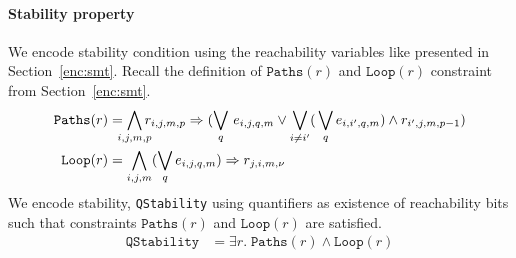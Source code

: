 \paragraph{Stability property}
%
%
We encode stability condition using the reachability variables like presented in Section~\ref{enc:smt}. 
%
Recall the definition of $\texttt{Paths}(r)$ and $\texttt{Loop}(r)$ constraint from Section~\ref{enc:smt}.
%  
\begin{align*}
\texttt{Paths}(r) &= \bigwedge\limits_{\mathclap{i,j,m,p}} r_{i,j,m,p} \limplies (\bigvee_{q} \, e_{i,j,q,m} \lor \bigvee_{i\neq i^{\prime}} ( \, \bigvee_{q} e_{i,i^{\prime},q,m}) \land r_{i^{\prime},j,m,p-1} )
\\
\texttt{Loop}(r) &= \bigwedge\limits_{i,j,m} (\bigvee_{q} e_{i,j,q,m}) \limplies r_{j,i,m,\nu}
\end{align*}
We encode stability, \texttt{QStability} using quantifiers as existence of reachability bits such that constraints $\texttt{Paths}(r)$ and $\texttt{Loop}(r)$ are satisfied.
\begin{align*}
\texttt{QStability} &= \exists r. \; \texttt{Paths}(r) \land \texttt{Loop}(r)
\end{align*}
